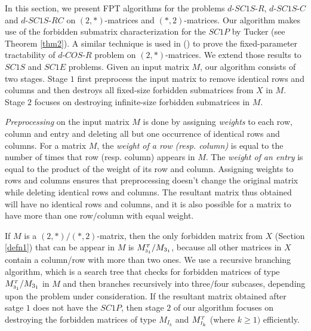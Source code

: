 \documentclass[review, 1p]{elsarticle}
\begin{document}
In this section, we present FPT algorithms for the problems $d$-$SC1S$-$R$, $d$-$SC1S$-$C$ and $d$-$SC1S$-$RC$ on $(2,*)$-matrices and $(*,2)$-matrices. Our algorithm makes use of the forbidden submatrix characterization for the $SC1P$ by Tucker (see Theorem \ref{thm2}). A similar technique is used in (\cite[Chapter 4]{dom2009recognition}) to prove the fixed-parameter tractability of $d$-$COS$-$R$ problem on $(2,*)$-matrices. We extend those results to $SC1S$ and $SC1E$ problems. Given an input matrix $M$, our algorithm consists of two stages. Stage $1$ first preprocess the input matrix to remove identical rows and columns and then destroys all fixed-size forbidden submatrices from $X$ in $M$. Stage $2$ focuses on destroying infinite-size forbidden submatrices in $M$.

\textit{Preprocessing}\label{preprocess} on the input matrix $M$ is done by assigning \textit{weights} to each row, column and entry and deleting all but one occurrence of identical rows and columns. For a matrix $M$, the \textit{weight of a row (resp. column)}\label{defn2} is equal to the number of times that row (resp. column) appears in $M$. The \textit{weight of an entry} is equal to the product of the weight of its row and column. Assigning weights to rows and columns ensures that preprocessing doesn't change the original matrix while deleting identical rows and columns. The resultant matrix thus obtained will have no identical rows and columns, and it is also possible for a matrix to have more than one row$/$column with equal weight. 

If $M$ is a $(2,*)/(*,2)$-matrix, then the only forbidden matrix from $X$ (Section \ref{defn1}) that can be appear in $M$ is  ${M^{\mathsmaller T}_{\mathsmaller 3_{1}}}/{M_{3_{1}}}$, because all other matrices in $X$ contain a column/row with more than two ones. We use a recursive branching algorithm, which is a search tree that checks for forbidden matrices of type ${M^{\mathsmaller T}_{\mathsmaller 3_{1}}}/{M_{3_{1}}}$ in $M$ and then branches recursively into three$/$four subcases, depending upon the problem under consideration. If the resultant matrix obtained after satge $1$ does not have the $SC1P$, then stage $2$ of our algorithm focuses on destroying the forbidden matrices of type $M_{I_{k}}$ and $M^{\mathsmaller T}_{\mathsmaller{I_{k}}}$ (where $k \geq 1)$ efficiently.
\end{document}

